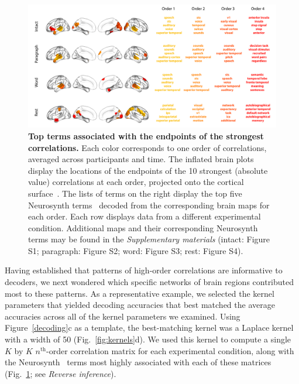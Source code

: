 \documentclass[english]{article}
\begin{document}
\begin{figure}[ht]
  \centering
  \includegraphics[width=\textwidth]{figs/most_abs}
  \caption{\textbf{Top terms associated with the endpoints of the
      strongest correlations.}  Each color corresponds to one order of
    correlations, averaged across participants and time. The inflated
    brain plots display the locations of the endpoints of the 10
    strongest (absolute value) correlations at each order, projected
    onto the cortical surface~\citep{CombEtal19}.  The lists of terms
    on the right display the top five Neurosynth
    terms~\citep{RubiEtal17} decoded from the corresponding brain maps
    for each order.  Each row displays data from a different
    experimental condition.  Additional maps and their corresponding
    Neurosynth terms may be found in the \textit{Supplementary
      materials} (intact: Figure S1; paragraph: Figure S2; word:
    Figure S3; rest: Figure S4).}
  \label{fig:neurosynth}
\end{figure}

Having established that patterns of high-order correlations are
informative to decoders, we next wondered which specific networks of
brain regions contributed most to these patterns.  As a representative
example, we selected the kernel parameters that yielded decoding
accuracies that best matched the average accuracies across all of the
kernel parameters we examined.  Using Figure~\ref{decoding}c as a
template, the best-matching kernel was a Laplace kernel with a width
of 50 (Fig.~\ref{fig:kernels}d).  We used this kernel to compute a
single $K$ by $K$ $n^\mathrm{th}$-order correlation matrix for each
experimental condition, along with the Neurosynth~\citep{RubiEtal17}
terms most highly associated with each of these matrices
(Fig.~\ref{fig:neurosynth}; see \textit{Reverse inference}).
\end{document}
